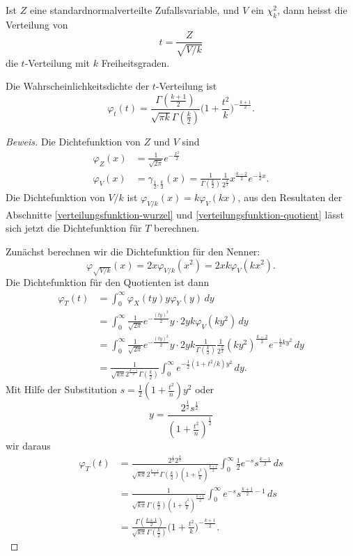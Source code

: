 \begin{definition}
Ist $Z$ eine standardnormalverteilte Zufallsvariable, und $V$ ein
$\chi_k^2$, dann heisst die Verteilung von
\[
t=\frac{Z}{\sqrt{V/k}}
\]
die $t$-Verteilung mit $k$ Freiheitsgraden.
\end{definition}

\begin{satz}Die Wahrscheinlichkeitsdichte der $t$-Verteilung ist
\begin{equation}
\varphi_t(t)
=
\frac{\Gamma(\frac{k+1}{2})}{\sqrt{\pi k}\Gamma(\frac{k}2)}
\biggl(1+\frac{t^2}{k}\biggr)^{-\frac{k+1}2}.
\end{equation}
\end{satz}

\begin{proof}[Beweis]
Die Dichtefunktion von $Z$ und $V$ sind
\begin{align*}
\varphi_Z(x)
&=
\frac1{\sqrt{2\pi}}e^{-\frac{x^2}2}
\\
\varphi_V(x)
&=
\gamma_{\frac12,\frac{k}2}(x)
=
\frac1{\Gamma(\frac{k}2)}\frac1{2^\frac{k}2}x^{\frac{k-2}2}e^{-\frac12x}.
\end{align*}
Die Dichtefunktion von $V/k$ ist $\varphi_{V/k}(x)=k\varphi_V(kx)$, aus
den Resultaten der Abschnitte \ref{verteilungsfunktion-wurzel}
und \ref{verteilungsfunktion-quotient} lässt sich jetzt die
Dichtefunktion für $T$ berechnen.

Zunächst berechnen wir die Dichtefunktion für den Nenner:
\[
\varphi_{\sqrt{V/k}}(x)=2x\varphi_{V/k}(x^2)=2xk\varphi_V(kx^2).
\]
Die Dichtefunktion für den Quotienten ist dann
\begin{align*}
\varphi_T(t)
&=
\int_0^\infty \varphi_X(ty)y\varphi_Y(y)\,dy
\\
&=
\int_0^\infty \frac1{\sqrt{2\pi}}e^{-\frac{(ty)^2}2}y\cdot
2yk\varphi_V(ky^2)\,dy
\\
&=
\int_0^\infty \frac1{\sqrt{2\pi}}e^{-\frac{(ty)^2}2}y\cdot
2yk
\frac1{\Gamma(\frac{k}2)}\frac1{2^{\frac{k}2}}(ky^2)^{\frac{k-2}2}e^{-\frac12ky^2}
\,dy
\\
&=
\frac1{\sqrt{k\pi}2^{\frac{k-1}2}\Gamma(\frac{k}2)}
\int_0^\infty e^{-\frac12(1+t^2/k)y^2} \,dy.
\end{align*}
Mit Hilfe der Substitution $s=\frac12(1+\frac{t^2}n)y^2$
oder
\[
y=\frac{2^{\frac12}s^{\frac12}}{(1+\frac{t^2}n)^{\frac12}}
\]
wir daraus
\begin{align*}
\varphi_T(t)
&=
\frac{2^{\frac12}2^{\frac{k}2}}{\sqrt{k\pi}2^{\frac{k-1}2}\Gamma(\frac{k}2)(1+\frac{t^2}k)^{\frac{k+1}2}}
\int_0^\infty \frac12e^{-s}s^{\frac{k-1}2}\,ds
\\
&=
\frac{1}{\sqrt{k\pi}\Gamma(\frac{k}2)(1+\frac{t^2}k)^{\frac{k+1}2}}
\int_0^\infty e^{-s}s^{\frac{k+1}2-1}\,ds
\\
&=
\frac{\Gamma(\frac{k+1}2)}{\sqrt{k\pi}\Gamma(\frac{k}2)}\biggl(1+\frac{t^2}k\biggr)^{-\frac{k+1}2}.
\end{align*}

\end{proof}


